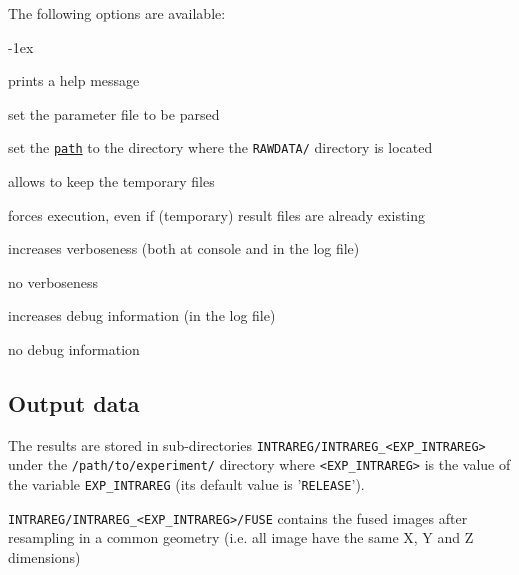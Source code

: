 The following options are available:
\begin{description}
  \itemsep -1ex
\item[\texttt{-h}] prints a help message
\item[\texttt{-p \underline{file}}] set the parameter file to be parsed
\item[\texttt{-e \underline{path}}] set the
  \texttt{\underline{path}} to the directory where the
  \texttt{RAWDATA/} directory is located
\item[\texttt{-k}] allows to keep the temporary files
\item[\texttt{-f}] forces execution, even if (temporary) result files
  are already existing
\item[\texttt{-v}] increases verboseness (both at console and in the
  log file)
\item[\texttt{-nv}] no verboseness
\item[\texttt{-d}]  increases debug information (in the
  log file)
\item[\texttt{-nd}] no debug information
\end{description}


\subsection{Output data}

The results are stored in sub-directories
\texttt{INTRAREG/INTRAREG\_<EXP\_INTRAREG>} under the
\texttt{/path/to/experiment/} directory where \texttt{<EXP\_INTRAREG>} is the value of the variable \texttt{EXP\_INTRAREG} (its
default value is '\texttt{RELEASE}'). 



\texttt{INTRAREG/INTRAREG\_<EXP\_INTRAREG>/FUSE} contains the fused
images after resampling in a common geometry (i.e. all image have the
same X, Y and Z dimensions)




